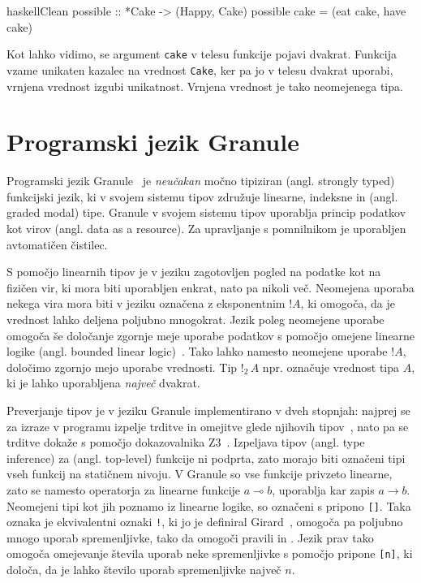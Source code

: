 \begin{code-box}{haskell}{Clean \cmark}
possible :: *Cake -> (Happy, Cake)
possible cake = (eat cake, have cake)
\end{code-box}

Kot lahko vidimo, se argument \texttt{cake} v telesu funkcije pojavi dvakrat. Funkcija vzame unikaten kazalec na vrednost \texttt{Cake}, ker pa jo v telesu dvakrat uporabi, vrnjena vrednost izgubi unikatnost. Vrnjena vrednost je tako neomejenega tipa.

\section{Programski jezik Granule}
\label{sec:granule}

Programski jezik Granule~\cite{orchard2019quantitative} je \textit{neučakan} močno tipiziran (angl. strongly typed) funkcijski jezik, ki v svojem sistemu tipov združuje linearne, indeksne in  (angl. graded modal) tipe. Granule v svojem sistemu tipov uporablja princip podatkov kot virov (angl. data as a resource). Za upravljanje s pomnilnikom je uporabljen avtomatičen čistilec. 

S pomočjo linearnih tipov je v jeziku zagotovljen pogled na podatke kot na fizičen vir, ki mora biti uporabljen enkrat, nato pa nikoli več. Neomejena uporaba nekega vira mora biti v jeziku označena z eksponentnim  $!A$, ki omogoča, da je vrednost lahko deljena poljubno mnogokrat. Jezik poleg neomejene uporabe omogoča še določanje zgornje meje uporabe podatkov s pomočjo omejene linearne logike (angl. bounded linear logic)~\cite{girard1992bounded}. Tako lahko namesto neomejene uporabe $!A$, določimo zgornjo mejo uporabe vrednosti. Tip $!_2 \, A$ npr. označuje vrednost tipa $A$, ki je lahko uporabljena \textit{največ} dvakrat.

Preverjanje tipov je v jeziku Granule implementirano v dveh stopnjah: najprej se za izraze v programu izpelje trditve in omejitve glede njihovih tipov~\cite{orchard2019quantitative}, nato pa se trditve dokaže s pomočjo dokazovalnika Z3~\cite{demoura2008z3}. Izpeljava tipov (angl. type inference) za  (angl. top-level) funkcije ni podprta, zato morajo biti označeni tipi vseh funkcij na statičnem nivoju. V Granule so vse funkcije privzeto linearne, zato se namesto operatorja za linearne funkcije $a \multimap b$, uporablja kar zapis $a \to b$. Neomejeni tipi kot jih poznamo iz linearne logike, so označeni s pripono \texttt{[]}. Taka oznaka je ekvivalentni oznaki \texttt{!}, ki jo je definiral Girard~\cite{girard1987linear}, omogoča pa poljubno mnogo uporab spremenljivke, tako da omogoči pravili  in . Jezik prav tako omogoča omejevanje števila uporab neke spremenljivke s pomočjo pripone \texttt{[n]}, ki določa, da je lahko število uporab spremenljivke največ $n$.

